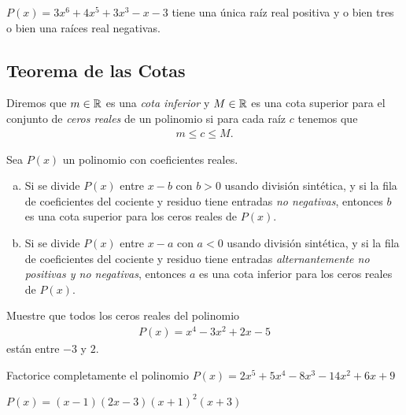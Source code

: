 \begin{ans}
	$P(x)= 3x^{6}+4x^{5}+3x^{3}-x-3$ tiene una única raíz real positiva y o bien tres o bien una raíces real negativas.
\end{ans}


\subsection{Teorema de las Cotas}
{}
Diremos que $m\in \mathbb{R}$ es una \emph{cota inferior} y $M\in \mathbb{R}$ es una cota superior para el conjunto de \emph{ceros reales} de un polinomio si para cada raíz $c$ tenemos que 
\begin{align*}
	m \leq c \leq M.
\end{align*}


{}
\begin{thm}
Sea $P(x)$ un polinomio con coeficientes reales.
\begin{enumerate}[(a)]
\item Si se divide $P(x)$ entre $x-b$ con $b>0$ usando división sintética, y si la fila de coeficientes del cociente y residuo tiene entradas \emph{no negativas}, entonces $b$ es una cota superior para los ceros reales de $P(x)$.
\item Si se divide $P(x)$ entre $x-a$ con $a<0$ usando división sintética, y si la fila de coeficientes del cociente y residuo tiene entradas \emph{alternantemente no positivas y no negativas}, entonces $a$ es una cota inferior para los ceros reales de $P(x)$.
\end{enumerate}

\end{thm}


{}
	\begin{problema}
		Muestre que todos los ceros reales del polinomio \begin{align*}
			P(x)=x^4-3x^{2}+2x-5
		\end{align*}
		están entre $-3$ y $2$.
	\end{problema}


{}
	\begin{problema}
		
		Factorice completamente el polinomio 
		$P(x)=2x^{5}+5x^{4}-8x^{3}-14x^{2}+6x+9$
	\end{problema}

\begin{ans}
	$P(x)=\left( x-1 \right)\left( 2x-3 \right)\left( x+1 \right)^{2}\left( x+3 \right)$
\end{ans}



